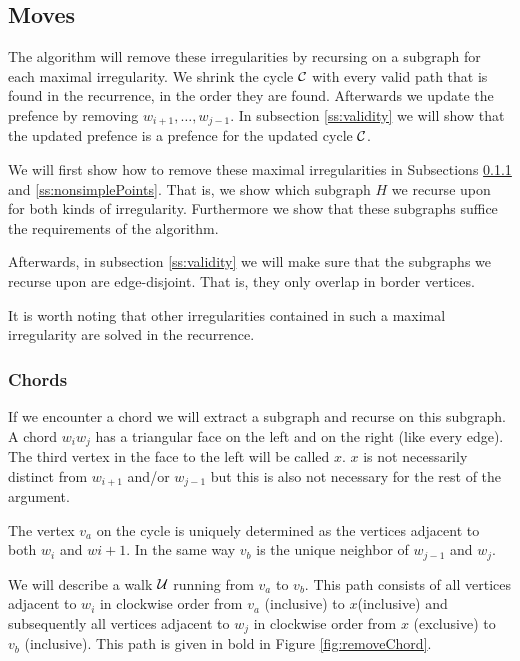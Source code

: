 \subsection{Moves}
  \newcommand{\U}{\scr U}
  The algorithm will remove these irregularities by recursing on a subgraph for each maximal irregularity. We shrink the cycle $\mathcal{C}$ with every valid path that is found in the recurrence, in the order they are found. Afterwards we update the prefence by removing $w_{i+1}, \ldots, w_{j-1}$. In subsection \ref{ss:validity} we will show that the updated prefence is a prefence for the updated cycle $\mathcal{C}$.


  We will first show how to remove these maximal irregularities in Subsections \ref{ss:chords} and \ref{ss:nonsimplePoints}. That is, we show which subgraph $H$ we recurse upon for both kinds of irregularity. Furthermore we show that these subgraphs suffice the requirements of the algorithm.

  Afterwards, in subsection \ref{ss:validity} we will make sure that the subgraphs we recurse upon are edge-disjoint. That is, they only overlap in border vertices.

  It is worth noting that other irregularities contained in such a maximal irregularity are solved in the recurrence.

  \subsubsection{Chords}
  \label{ss:chords}
  If we encounter a chord we will extract a subgraph and recurse on this subgraph. A chord $w_iw_j$ has a triangular face on the left and on the right (like every edge). The third vertex in the face to the left will be called $x$. $x$ is not necessarily distinct from $w_{i+1}$ and/or $w_{j-1}$ but this is also not necessary for the rest of the argument. 

  The vertex $v_a$ on the cycle is uniquely determined as the vertices adjacent to both $w_i$ and $w{i+1}$. In the same way $v_b$ is the unique neighbor of $w_{j-1}$ and $w_j$.

  We will describe a walk $\mathcal{U}$ running from $v_a$ to $v_b$. This path consists of all vertices adjacent to $w_i$ in clockwise order from $v_a$ (inclusive) to $x$(inclusive) and subsequently all vertices adjacent to $w_j$ in clockwise order from $x$ (exclusive) to $v_b$ (inclusive). This path is given in bold in Figure \ref{fig:removeChord}.

